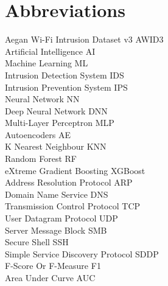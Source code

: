 
\section*{Abbreviations}
\large 

Aegan Wi-Fi Intrusion Dataset v3 \hfill AWID3 \\
Artificial Intelligence \hfill AI\\
Machine Learning \hfill ML\\
Intrusion Detection System \hfill IDS\\
Intrusion Prevention System \hfill IPS\\
Neural Network \hfill NN\\
Deep Neural Network \hfill DNN\\
Multi-Layer Perceptron \hfill MLP\\
Autoencoders \hfill AE\\
K Nearest Neighbour \hfill KNN\\
Random Forest \hfill RF\\
eXtreme Gradient Boosting \hfill XGBoost \\
Address Resolution Protocol \hfill ARP\\
Domain Name Service \hfill DNS\\
Transmission Control Protocol \hfill TCP\\
User Datagram Protocol \hfill UDP\\
Server Message Block \hfill SMB\\
Secure Shell \hfill SSH\\
Simple Service Discovery Protocol \hfill SDDP\\
F-Score Or F-Measure  \hfill F1\\
Area Under Curve  \hfill AUC\
\\

